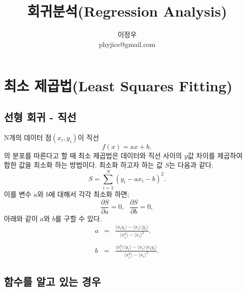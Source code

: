 \documentclass[chapter,a4paper,10pt]{oblivoir}
\begin{document}
\title{회귀분석(Regression Analysis)}
\author{이정우\\phyjics@gmail.com}
\maketitle
\tableofcontents

\chapter{최소 제곱법(Least Squares Fitting)}

\section{선형 회귀 - 직선}

N개의 데이터 점$(x_i, y_i)$이 직선
\begin{equation}
f(x) = ax + b,
\end{equation}
의 분포를 따른다고 할 때 최소 제곱법은 데이터와 직선 사이의 $y$값 차이를 제곱하여 합한 값을 최소화 하는 방법이다.
최소화 하고자 하는 값 $S$는 다음과 같다.
\begin{equation}
S = \sum_{i=1}^N (y_i - ax_i - b)^2.
\end{equation}
이를 변수 $a$와 $b$에 대해서 각각 최소화 하면;
\begin{equation}
\frac{\partial S}{\partial a} = 0,\,\,\,\, \frac{\partial S}{\partial b} = 0,
\end{equation}
아래와 같이 $a$와 $b$를 구할 수 있다.
\begin{eqnarray}
a 
&=& \frac{\langle x_i y_i \rangle - \langle x_i \rangle \langle y_i\rangle}{\langle x_i^2 \rangle - \langle x_i \rangle^2}.
\\\nonumber\\
b 
&=& \frac{\langle x_i^2 \rangle \langle y_i \rangle - \langle x_i \rangle \langle x_i y_i\rangle}{\langle x_i^2 \rangle- \langle x_i\rangle^2}.
\end{eqnarray}


\section{함수를 알고 있는 경우}
\end{document}
